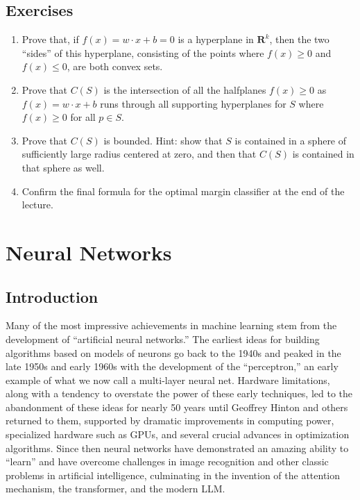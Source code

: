 \documentclass[
  11pt,
  letterpaper,
]{scrbook}
\theoremstyle{plain}
\theoremstyle{remark}
\begin{document}
\hypertarget{sec-exercises}{%
\section{Exercises}\label{sec-exercises}}

\begin{enumerate}
\def\labelenumi{\arabic{enumi}.}
\item
  Prove that, if \(f(x)=w\cdot x+b=0\) is a hyperplane in
  \(\mathbf{R}^{k}\), then the two ``sides'' of this hyperplane,
  consisting of the points where \(f(x)\ge 0\) and \(f(x)\le 0\), are
  both convex sets.
\item
  Prove that \(C(S)\) is the intersection of all the halfplanes
  \(f(x)\ge 0\) as \(f(x)=w\cdot x+b\) runs through all supporting
  hyperplanes for \(S\) where \(f(x)\ge 0\) for all \(p\in S\).
\item
  Prove that \(C(S)\) is bounded. Hint: show that \(S\) is contained in
  a sphere of sufficiently large radius centered at zero, and then that
  \(C(S)\) is contained in that sphere as well.
\item
  Confirm the final formula for the optimal margin classifier at the end
  of the lecture.
\end{enumerate}


\hypertarget{neural-networks}{%
\chapter{Neural Networks}\label{neural-networks}}

\hypertarget{introduction-5}{%
\section{Introduction}\label{introduction-5}}

Many of the most impressive achievements in machine learning stem from
the development of ``artificial neural networks.'' The earliest ideas
for building algorithms based on models of neurons go back to the 1940s
and peaked in the late 1950s and early 1960s with the development of the
``perceptron,'' an early example of what we now call a multi-layer
neural net. Hardware limitations, along with a tendency to overstate the
power of these early techniques, led to the abandonment of these ideas
for nearly 50 years until Geoffrey Hinton and others returned to them,
supported by dramatic improvements in computing power, specialized
hardware such as GPUs, and several crucial advances in optimization
algorithms. Since then neural networks have demonstrated an amazing
ability to ``learn'' and have overcome challenges in image recognition
and other classic problems in artificial intelligence, culminating in
the invention of the attention mechanism, the transformer, and the
modern LLM.
\end{document}
